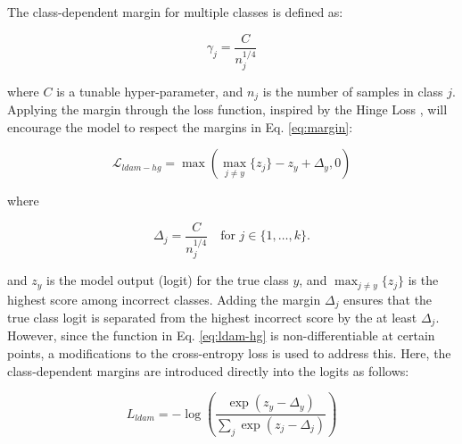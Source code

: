 The class-dependent margin for multiple classes is defined as:

\begin{equation}
    \label{eq:margin}
    \gamma_j = \frac{C}{n^{1/4}_j}
\end{equation}

\noindent where $C$ is a tunable hyper-parameter, and $n_j$ is the number of samples in class $j$. Applying the margin through the loss function, inspired by the Hinge Loss \cite{cao2019learningimbalanceddatasetslabeldistributionaware}, will encourage the model to respect the margins in Eq. \eqref{eq:margin}:

\begin{equation}
    \label{eq:ldam-hg}
    \mathcal{L}_{ldam-hg} = \max\left(\max_{j \neq y}\{z_j\} - z_y + \Delta_y, 0\right)
\end{equation}

\noindent where

\begin{equation}
    \Delta_j = \frac{C}{n_j^{1/4}} \quad \text{for } j \in \{1, \dots, k\}.
\end{equation}

\noindent and $z_y$ is the model output (logit) for the true class $y$, and $\max_{j \neq y}\{z_j\}$ is the highest score among incorrect classes. Adding the margin $\Delta_j$ ensures that the true class logit is separated from the highest incorrect score by the at least $\Delta_j$. However, since the function in Eq. \eqref{eq:ldam-hg} is non-differentiable at certain points, a modifications to the cross-entropy loss is used to address this. Here, the class-dependent margins are introduced directly into the logits as follows:

\begin{equation}
    \label{eq:ldam}
    L_{ldam} = - \log\left( \frac{\exp(z_y - \Delta_y)}{\sum_j \exp(z_j - \Delta_j)} \right)
\end{equation}